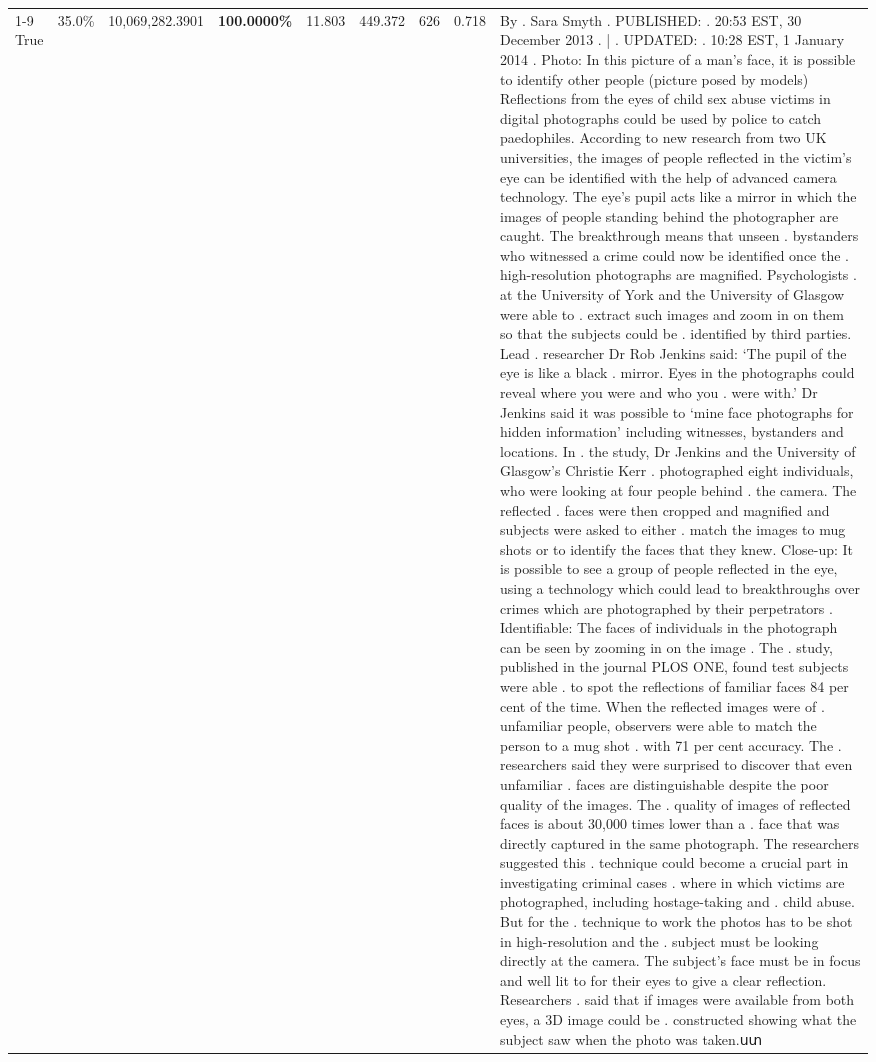 \begin{table}[H]
\begin{tabular}{lllrlllll}
\cline{1-9}
True & 35.0\% & 10,069,282.3901 & \bfseries \color{red} 100.0000\% & 11.803 & 449.372 & 626 & 0.718 & By . Sara Smyth . PUBLISHED: . 20:53 EST, 30 December 2013 . | . UPDATED: . 10:28 EST, 1 January 2014 . Photo: In this picture of a man's face, it is possible to identify other people (picture posed by models) Reflections from the eyes of child sex abuse victims in digital photographs could be used by police to catch paedophiles. According to new research from two UK universities, the images of people reflected in the victim's eye can be identified with the help of advanced camera technology. The eye's pupil acts like a mirror in which the images of people standing behind the photographer are caught. The breakthrough means that unseen . bystanders who witnessed a crime could now be identified once the . high-resolution photographs are magnified. Psychologists . at the University of York and the University of Glasgow were able to . extract such images and zoom in on them so that the subjects could be . identified by third parties. Lead . researcher Dr Rob Jenkins said: ‘The pupil of the eye is like a black . mirror. Eyes in the photographs could reveal where you were and who you . were with.' Dr Jenkins said it was possible to ‘mine face photographs for hidden information' including witnesses, bystanders and locations. In . the study, Dr Jenkins and the University of Glasgow's Christie Kerr . photographed eight individuals, who were looking at four people behind . the camera. The reflected . faces were then cropped and magnified and subjects were asked to either . match the images to mug shots or to identify the faces that they knew. Close-up: It is possible to see a group of people reflected in the eye, using a technology which could lead to breakthroughs over crimes which are photographed by their perpetrators . Identifiable: The faces of individuals in the photograph can be seen by zooming in on the image . The . study, published in the journal PLOS ONE, found test subjects were able . to spot the reflections of familiar faces 84 per cent of the time. When the reflected images were of . unfamiliar people, observers were able to match the person to a mug shot . with 71 per cent accuracy. The . researchers said they were surprised to discover that even unfamiliar . faces are distinguishable despite the poor quality of the images. The . quality of images of reflected faces is about 30,000 times lower than a . face that was directly captured in the same photograph. The researchers suggested this . technique could become a crucial part in investigating criminal cases . where in which victims are photographed, including hostage-taking and . child abuse. But for the . technique to work the photos has to be shot in high-resolution and the . subject must be looking directly at the camera. The subject's face must be in focus and well lit to for their eyes to give a clear reflection. Researchers . said that if images were available from both eyes, a 3D image could be . constructed showing what the subject saw when the photo was taken.ստ \\

\end{tabular}
\end{table}
